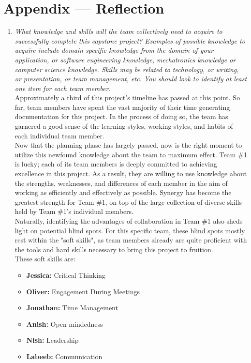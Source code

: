 \documentclass[12pt, titlepage]{article}
\begin{document}
\newpage{}
\section*{Appendix --- Reflection}

\begin{enumerate}
  \item \textit{What knowledge and skills will the team collectively need to acquire to
          successfully complete this capstone project?  Examples of possible knowledge
          to acquire include domain specific knowledge from the domain of your
          application, or software engineering knowledge, mechatronics knowledge or
          computer science knowledge.  Skills may be related to technology, or writing,
          or presentation, or team management, etc.  You should look to identify at
          least one item for each team member.}\\

        Approximately a third of this project's timeline has passed at this point. So far, team members have spent the vast majority of their time generating documentation for this project. In the process of doing so, the team has garnered a good sense of the learning styles, working styles, and habits of each individual team member.\\

        Now that the planning phase has largely passed, now is the right moment to utilize this newfound knowledge about the team to maximum effect. Team \#1 is lucky; each of its team members is deeply committed to achieving excellence in this project. As a result, they are willing to use knowledge about the strengths, weaknesses, and differences of each member in the aim of working as efficiently and effectively as possible. Synergy has become the greatest strength for Team \#1, on top of the large collection of diverse skills held by Team \#1's individual members.\\

        Naturally, identifying the advantages of collaboration in Team \#1 also sheds light on potential blind spots. For this specific team, these blind spots mostly rest within the "soft skills", as team members already are quite proficient with the tools and hard skills necessary to bring this project to fruition.\\

        These soft skills are:
        \begin{itemize}
          \item \textbf{Jessica:} Critical Thinking
          \item \textbf{Oliver:} Engagement During Meetings
          \item \textbf{Jonathan:} Time Management
          \item \textbf{Anish:} Open-mindedness
          \item \textbf{Nish:} Leadership
          \item \textbf{Labeeb:} Communication
        \end{itemize}


\end{enumerate}
\end{document}
